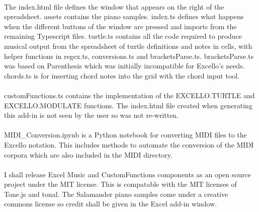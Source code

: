 \paragraph{} The index.html file defines the window that appears on the right of the spreadsheet. assets contains the piano samples. index.ts defines what happens when the different buttons of the window are pressed and imports from the remaining Typescript files. turtle.ts contains all the code required to produce musical output from the spreadsheet of turtle definitions and notes in cells, with helper functions in regex.ts, conversions.ts and bracketsParse.ts. bracketsParse.ts was based on Parenthesis which was initially incompatible for Excello's needs. chords.ts is for inserting chord notes into the grid with the chord input tool.

\paragraph{} customFunctions.ts contains the implementation of the EXCELLO.TURTLE and EXCELLO.MODULATE functions. The index.html file created when generating this add-in is not seen by the user so was not re-written.

\paragraph{} MIDI\_Conversion.ipynb is a Python notebook for converting MIDI files to the Excello notation. This includes methods to automate the conversion of the MIDI corpora which are also included in the MIDI directory.

\paragraph{} I shall release Excel Music and CustomFunctions components as an open source project under the MIT license. This is compatable with the MIT licenses of Tone.js and tonal. The Salamander piano samples come under a creative commons license so credit shall be given in the Excel add-in window.
